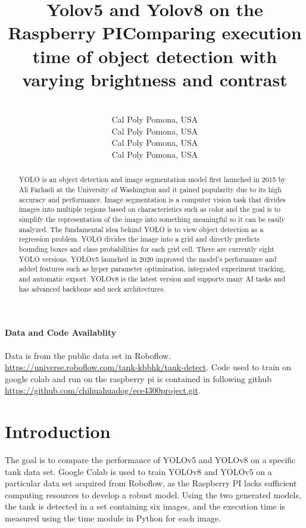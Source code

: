 \documentclass[pmlr,twocolumn,10pt]{jmlr} %
\title[Short Title]{Yolov5 and Yolov8 on the Raspberry PI\titlebreak Comparing execution time of object detection with varying brightness and contrast}
\author{%
\Name{Ruben Torres Romero}\equal{These authors contributed equally} \Email{rubent@cpp.edu}\\
\addr Cal Poly Pomona, USA
\AND
\Name{Ryan Caran Dang}\footnotemark[1] \Email{rrcarendang@cpp.edu}\\
\addr Cal Poly Pomona, USA
\AND
\Name{Ariel Suarez}\footnotemark[1] \Email{suarez@cpp.edu}\\
\addr Cal Poly Pomona, USA
\AND
\Name{Leslie Lin} \Email{lllin.@cpp.edu}\\
\addr Cal Poly Pomona, USA
}
\begin{document}
\maketitle

\begin{abstract}
YOLO is an object detection and image segmentation model first launched in 2015 by Ali Farhadi at the University of Washington and it gained popularity due to its high accuracy and performance. Image segmentation is a computer vision task that divides images into multiple regions based on characteristics such as color and the goal is to simplify the representation of the image into something meaningful so it can be easily analyzed. The fundamental idea behind YOLO is to view object detection as a regression problem. YOLO divides the image into a grid and directly predicts bounding boxes and class probabilities for each grid cell. There are currently eight YOLO versions. YOLOv5 launched in 2020 improved the model's performance and added features such as hyper parameter optimization, integrated experiment tracking, and automatic export. YOLOv8 is the latest version and supports many AI tasks and has advanced backbone and neck architectures. 
\end{abstract}

\paragraph*{Data and Code Availablity}
Data is from the public data set in Roboflow. 
\url{https://universe.roboflow.com/tank-kbbhk/tank-detect}. 
Code used to train on google colab and run on the raspberry pi is contained in following github
\url{https://github.com/chihuahuadog/ece4300project.git}. 

\section{Introduction}
\label{sec:intro}
The goal is to compare the performance of YOLOv5 and YOLOv8 on a specific tank data set. Google Colab is used to train YOLOv8 and YOLOv5 on a particular data set acquired from Roboflow, as the Raspberry PI lacks sufficient computing resources to develop a robust model. Using the two generated models, the tank is detected in a set containing six images, and the execution time is measured using the time module in Python for each image.
\end{document}

